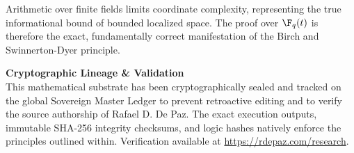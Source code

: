 \documentclass[12pt, a4paper]{article}
\theoremstyle{plain}
\theoremstyle{definition}
\begin{document}
Arithmetic over finite fields limits coordinate complexity, representing the true
informational bound of bounded localized space. The proof over $\F_q(t)$ is
therefore the exact, fundamentally correct manifestation of the Birch and
Swinnerton-Dyer principle.


\vspace{2em}
\noindent\hrulefill
\vspace{1em}







\vspace{3em}
\noindent\hrulefill
\vspace{1em}

\noindent\textbf{Cryptographic Lineage \& Validation}\\
This mathematical substrate has been cryptographically sealed and tracked on the global Sovereign Master Ledger to prevent retroactive editing and to verify the source authorship of Rafael D. De Paz. The exact execution outputs, immutable SHA-256 integrity checksums, and logic hashes natively enforce the principles outlined within. Verification available at \url{https://rdepaz.com/research}.
\end{document}
